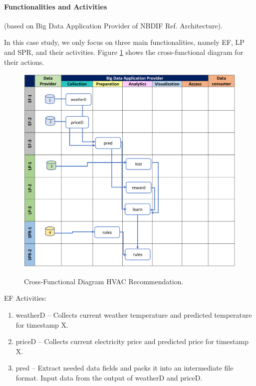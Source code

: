 \paragraph*{Functionalities and Activities} (based on Big Data Application Provider of NBDIF Ref. Architecture).

In this case study, we only focus on three main functionalities, namely EF, LP and SPR, and their activities. Figure \ref{fig:hvac2_func_diagram} shows the cross-functional diagram for their actions.



\begin{figure}[htb]
\centering\includegraphics[width=1.0\columnwidth]{usecase/hvac-2.png}
\label{fig:hvac2_func_diagram}
\caption{Cross-Functional Diagram HVAC Recommendation.}
\end{figure}


EF Activities:

\begin{enumerate}
\item weatherD – Collects current weather temperature and predicted temperature for timestamp X.
\item priceD – Collects current electricity price and predicted price for timestamp X.
\item pred – Extract needed data fields and packs it into an intermediate file format. Input data from the output of weatherD and priceD.
\end{enumerate}


